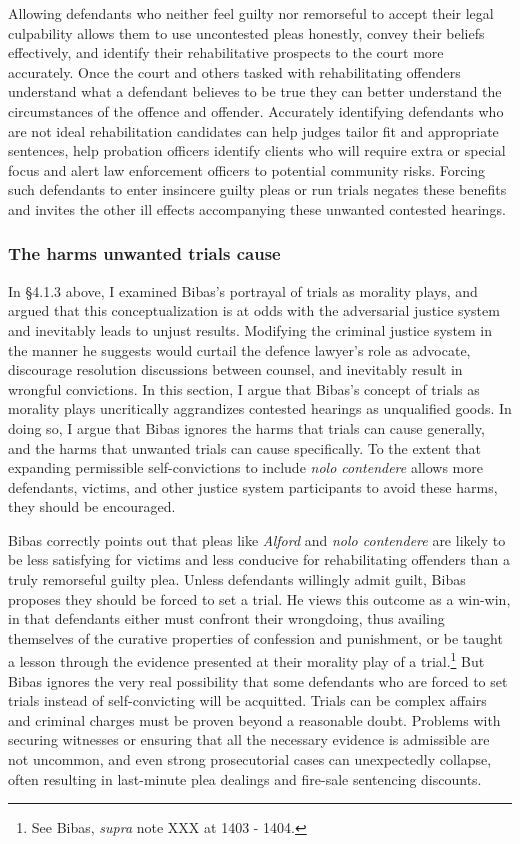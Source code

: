 Allowing defendants who neither feel guilty nor remorseful to accept their legal culpability allows them to use uncontested pleas honestly, convey their beliefs effectively, and identify their rehabilitative prospects to the court more accurately. Once the court and others tasked with rehabilitating offenders understand what a defendant believes to be true they can better understand the circumstances of the offence and offender. Accurately identifying defendants who are not ideal rehabilitation candidates can help judges tailor fit and appropriate sentences, help probation officers identify clients who will require extra or special focus and alert law enforcement officers to potential community risks. Forcing such defendants to enter insincere guilty pleas or run trials negates these benefits and invites the other ill effects accompanying these unwanted contested hearings.

\subsubsection{The harms unwanted trials cause}

In \S 4.1.3 above, I examined Bibas's portrayal of trials as morality plays, and argued that this conceptualization is at odds with the adversarial justice system and inevitably leads to unjust results. Modifying the criminal justice system in the manner he suggests would curtail the defence lawyer's role as advocate, discourage resolution discussions between counsel, and inevitably result in wrongful convictions. In this section, I argue that Bibas's concept of trials as morality plays uncritically aggrandizes contested hearings as unqualified goods. In doing so, I argue that Bibas ignores the harms that trials can cause generally, and the harms that unwanted trials can cause specifically. To the extent that expanding permissible self-convictions to include \textit{nolo contendere} allows more defendants, victims, and other justice system participants to avoid these harms, they should be encouraged.

Bibas correctly points out that pleas like \textit{Alford} and \textit{nolo contendere} are likely to be less satisfying for victims and less conducive for rehabilitating offenders than a truly remorseful guilty plea. Unless defendants willingly admit guilt, Bibas proposes they should be forced to set a trial. He views this outcome as a win-win, in that defendants either must confront their wrongdoing, thus availing themselves of the curative properties of confession and punishment, or be taught a lesson through the evidence presented at their morality play of a trial.\footnote{See Bibas, \textit{supra} note XXX at 1403 - 1404.} But Bibas ignores the very real possibility that some defendants who are forced to set trials instead of self-convicting will be acquitted. Trials can be complex affairs and criminal charges must be proven beyond a reasonable doubt. Problems with securing witnesses or ensuring that all the necessary evidence is admissible are not uncommon, and even strong prosecutorial cases can unexpectedly collapse, often resulting in last-minute plea dealings and fire-sale sentencing discounts. 

